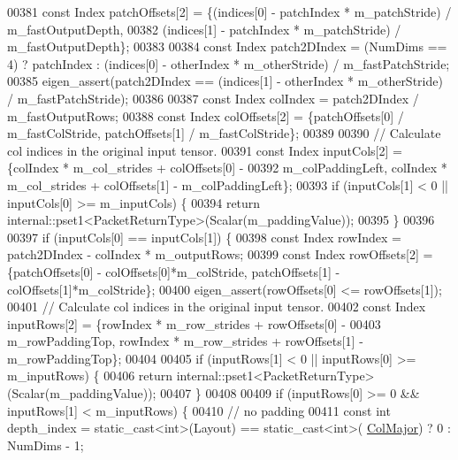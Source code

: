 \begin{DoxyCode}
00381     \textcolor{keyword}{const} Index patchOffsets[2] = \{(indices[0] - patchIndex * m\_patchStride) / m\_fastOutputDepth,
00382                                    (indices[1] - patchIndex * m\_patchStride) / m\_fastOutputDepth\};
00383 
00384     \textcolor{keyword}{const} Index patch2DIndex = (NumDims == 4) ? patchIndex : (indices[0] - otherIndex * m\_otherStride) / 
      m\_fastPatchStride;
00385     eigen\_assert(patch2DIndex == (indices[1] - otherIndex * m\_otherStride) / m\_fastPatchStride);
00386 
00387     \textcolor{keyword}{const} Index colIndex = patch2DIndex / m\_fastOutputRows;
00388     \textcolor{keyword}{const} Index colOffsets[2] = \{patchOffsets[0] / m\_fastColStride, patchOffsets[1] / m\_fastColStride\};
00389 
00390     \textcolor{comment}{// Calculate col indices in the original input tensor.}
00391     \textcolor{keyword}{const} Index inputCols[2] = \{colIndex * m\_col\_strides + colOffsets[0] -
00392       m\_colPaddingLeft, colIndex * m\_col\_strides + colOffsets[1] - m\_colPaddingLeft\};
00393     \textcolor{keywordflow}{if} (inputCols[1] < 0 || inputCols[0] >= m\_inputCols) \{
00394       \textcolor{keywordflow}{return} internal::pset1<PacketReturnType>(Scalar(m\_paddingValue));
00395     \}
00396 
00397     \textcolor{keywordflow}{if} (inputCols[0] == inputCols[1]) \{
00398       \textcolor{keyword}{const} Index rowIndex = patch2DIndex - colIndex * m\_outputRows;
00399       \textcolor{keyword}{const} Index rowOffsets[2] = \{patchOffsets[0] - colOffsets[0]*m\_colStride, patchOffsets[1] - 
      colOffsets[1]*m\_colStride\};
00400       eigen\_assert(rowOffsets[0] <= rowOffsets[1]);
00401       \textcolor{comment}{// Calculate col indices in the original input tensor.}
00402       \textcolor{keyword}{const} Index inputRows[2] = \{rowIndex * m\_row\_strides + rowOffsets[0] -
00403         m\_rowPaddingTop, rowIndex * m\_row\_strides + rowOffsets[1] - m\_rowPaddingTop\};
00404 
00405       \textcolor{keywordflow}{if} (inputRows[1] < 0 || inputRows[0] >= m\_inputRows) \{
00406         \textcolor{keywordflow}{return} internal::pset1<PacketReturnType>(Scalar(m\_paddingValue));
00407       \}
00408 
00409       \textcolor{keywordflow}{if} (inputRows[0] >= 0 && inputRows[1] < m\_inputRows) \{
00410         \textcolor{comment}{// no padding}
00411         \textcolor{keyword}{const} \textcolor{keywordtype}{int} depth\_index = \textcolor{keyword}{static\_cast<}\textcolor{keywordtype}{int}\textcolor{keyword}{>}(Layout) == static\_cast<int>(
      \hyperlink{group__enums_ggaacded1a18ae58b0f554751f6cdf9eb13a0cbd4bdd0abcfc0224c5fcb5e4f6669a}{ColMajor}) ? 0 : NumDims - 1;

\end{DoxyCode}
